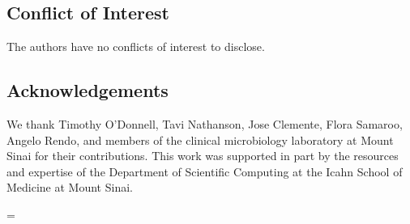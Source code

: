 \subsection*{Conflict of Interest}

The authors have no conflicts of interest to disclose.

\subsection*{Acknowledgements}

We thank Timothy O’Donnell, Tavi Nathanson, Jose Clemente, Flora Samaroo, Angelo Rendo, and members of the clinical microbiology laboratory at Mount Sinai for their contributions. This work was supported in part by the resources and expertise of the Department of Scientific Computing at the Icahn School of Medicine at Mount Sinai.

\emergencystretch=\esfix %